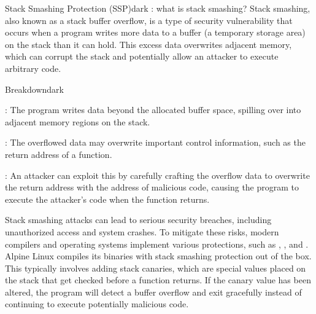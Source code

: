 \label{Stack Smashing Protection (SSP)}
\begin{baseBoxThree}{Stack Smashing Protection (SSP)}{dark}
    \bigskip
    : what is stack smashing?
    Stack smashing, also known as a stack buffer overflow, is a type of security vulnerability that occurs when a program writes more data to a buffer (a temporary storage area) on the stack than it can hold.
    This excess data overwrites adjacent memory, which can corrupt the stack and potentially allow an attacker to execute arbitrary code.
    \bigskip
    \begin{baseBoxThree}{Breakdown}{dark}
        \smallskip
        \begin{posnexItemize}
            \item[\sA] : The program writes data beyond the allocated buffer space, spilling over into adjacent memory regions on the stack.
            \item[\sA] : The overflowed data may overwrite important control information, such as the return address of a function.
            \item[\sA] : An attacker can exploit this by carefully crafting the overflow data to overwrite the return address with the address of malicious code, causing the program to execute the attacker's code when the function returns.
        \end{posnexItemize}
        \smallskip
    \end{baseBoxThree}
    \smallskip
    Stack smashing attacks can lead to serious security breaches, including unauthorized access and system crashes.
    To mitigate these risks, modern compilers and operating systems implement various protections, such as , , and .
    \\

    Alpine Linux compiles its binaries with stack smashing protection out of the box.
    This typically involves adding stack canaries, which are special values placed on the stack that get checked before a function returns.
    If the canary value has been altered, the program will detect a buffer overflow and exit gracefully instead of continuing to execute potentially malicious code.

    \smallskip
\end{baseBoxThree}
\smallskip

